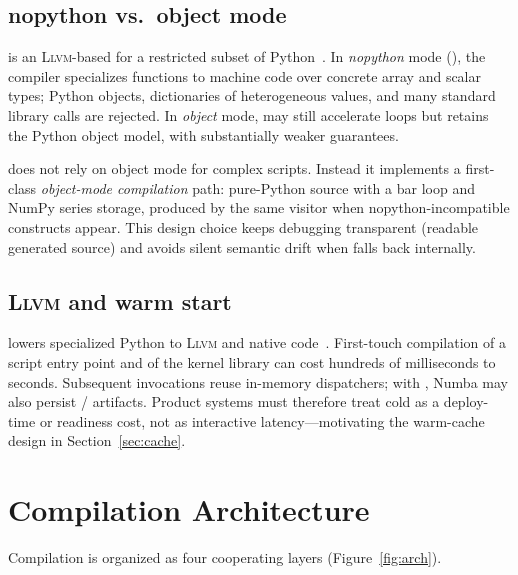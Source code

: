 \documentclass[11pt,a4paper]{article}
\newcommand{\llvm}{\textsc{Llvm}}
\begin{document}
\subsection{\numba{} nopython vs.\ object mode}
\label{sec:bg-numba}

\numba{} is an \llvm{}-based \jit{} for a restricted subset of
Python~\citep{lam2015numba}. In \emph{nopython} mode (), the
compiler specializes functions to machine code over concrete array and scalar
types; Python objects, dictionaries of heterogeneous values, and many standard
library calls are rejected. In \emph{object} mode, \numba{} may still
accelerate loops but retains the Python object model, with substantially
weaker guarantees.

\pyne{} does not rely on \numba{} object mode for complex scripts. Instead it
implements a first-class \emph{object-mode compilation} path: pure-Python
source with a bar loop and NumPy series storage, produced by the same
visitor when nopython-incompatible constructs appear. This design choice
keeps debugging transparent (readable generated source) and avoids silent
semantic drift when \numba{} falls back internally.

\subsection{\llvm{} \jit{} and warm start}
\label{sec:bg-llvm}

\numba{} lowers specialized Python to \llvm{} \ir{} and native
code~\citep{lattner2004llvm}. First-touch compilation of a script entry
point and of the kernel library can cost hundreds of milliseconds to seconds.
Subsequent invocations reuse in-memory dispatchers; with
, Numba may also persist / artifacts.
Product systems must therefore treat cold \jit{} as a deploy-time or
readiness cost, not as interactive latency---motivating the warm-cache design
in Section~\ref{sec:cache}.

\section{Compilation Architecture}
\label{sec:arch}

Compilation is organized as four cooperating layers (Figure~\ref{fig:arch}).
\end{document}
